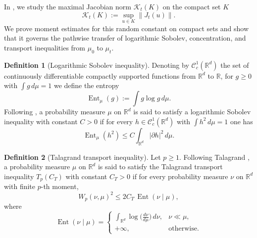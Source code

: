 \documentclass{tsp-short}
\theoremstyle{remark}
\theoremstyle{definition}
\newtheorem{definition}{Definition}[section]
\newcommand{\R}{\mathbb{R}} %
\newcommand{\cC}{\mathcal{C}} %
\DeclareMathOperator{\Ent}{Ent} %
\begin{document}
In , we study the maximal Jacobian norm \(\mathcal K_t(K)\) on the compact set \(K\)
\begin{equation*}
	\mathcal K_t(K):=\sup_{u\in K}\|J_t(u)\|.
\end{equation*}
We prove moment estimates for this random constant on compact sets and
show that it governs the pathwise transfer of logarithmic Sobolev, concentration, and transport inequalities from \(\mu_0\) to
\(\mu_t\).
\begin{definition}[Logarithmic Sobolev inequality]
	Denoting by \(\cC_c^1(\R^d)\) the set of continuously differentiable compactly supported functions from \(\R^d\) to \(\R\), for
	\(g\ge 0\) with \(\int g\,d\mu=1\) we define the entropy
	\begin{equation*}
		\Ent_\mu(g):=\int g\log g\,d\mu.
	\end{equation*}
	Following \cite[Chapter~5]{ledoux2001concentration}, a probability measure \(\mu\) on \(\R^d\) is said to satisfy a logarithmic Sobolev
	inequality with constant \(C>0\) if for every \(h\in\cC_c^1(\R^d)\) with \(\int h^2\,d\mu=1\) one has
	\begin{equation*}
		\Ent_\mu(h^2)\le C\int_{\R^d}|\partial h|^2\,d\mu.
	\end{equation*}
\end{definition}

\begin{definition}[Talagrand transport inequality]
	Let \(p\ge1\). Following Talagrand \cite{talagrand1996transportation}, a probability measure \(\mu\) on \(\R^d\) is said to satisfy
	the Talagrand transport inequality \(T_p(C_T)\) with constant \(C_T>0\) if for every probability measure \(\nu\) on \(\R^d\)
	with finite \(p\)-th moment,
	\begin{equation*}
		W_p(\nu,\mu)^2 \le 2C_T\,\Ent(\nu\mid \mu),
	\end{equation*}
	where
	\begin{equation*}
		\Ent(\nu\mid\mu)=
		\begin{cases}
			\displaystyle \int_{\R^d}\log\Big(\frac{d\nu}{d\mu}\Big)\,d\nu, & \nu\ll \mu,       \\[3mm]
			+\infty,                                                        & \text{otherwise}.
		\end{cases}
	\end{equation*}
\end{definition}
\end{document}
